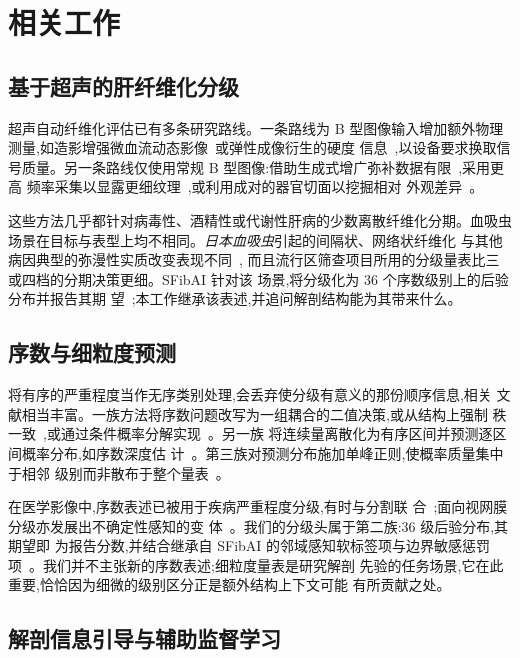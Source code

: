 \section{相关工作}
\label{sec:related}

\subsection{基于超声的肝纤维化分级}

超声自动纤维化评估已有多条研究路线。一条路线为 B 型图像输入增加额外物理
测量,如造影增强微血流动态影像~\cite{microflow2023}或弹性成像衍生的硬度
信息~\cite{swe2018staging},以设备要求换取信号质量。另一条路线仅使用常规
B 型图像:借助生成式增广弥补数据有限~\cite{usfibrosisgan2022},采用更高
频率采集以显露更细纹理~\cite{hfus2025},或利用成对的器官切面以挖掘相对
外观差异~\cite{liverspleen2025}。

这些方法几乎都针对病毒性、酒精性或代谢性肝病的少数离散纤维化分期。血吸虫
场景在目标与表型上均不相同。\emph{日本血吸虫}引起的间隔状、网络状纤维化
与其他病因典型的弥漫性实质改变表现不同~\cite{schistoelasto2018,schistopocus2024},
而且流行区筛查项目所用的分级量表比三或四档的分期决策更细。SFibAI 针对该
场景,将分级化为 36 个序数级别上的后验分布并报告其期
望~\cite{xu2026sfibai};本工作继承该表述,并追问解剖结构能为其带来什么。

\subsection{序数与细粒度预测}

将有序的严重程度当作无序类别处理,会丢弃使分级有意义的那份顺序信息,相关
文献相当丰富。一族方法将序数问题改写为一组耦合的二值决策,或从结构上强制
秩一致~\cite{coral2020},或通过条件概率分解实现~\cite{corn2023}。另一族
将连续量离散化为有序区间并预测逐区间概率分布,如序数深度估
计~\cite{dorn2018}。第三族对预测分布施加单峰正则,使概率质量集中于相邻
级别而非散布于整个量表~\cite{unimodalbeta2021}。

在医学影像中,序数表述已被用于疾病严重程度分级,有时与分割联
合~\cite{sonnet2022};面向视网膜分级亦发展出不确定性感知的变
体~\cite{drgraduate2020}。我们的分级头属于第二族:36 级后验分布,其期望即
为报告分数,并结合继承自 SFibAI 的邻域感知软标签项与边界敏感惩罚
项~\cite{xu2026sfibai}。我们并不主张新的序数表述;细粒度量表是研究解剖
先验的任务场景,它在此重要,恰恰因为细微的级别区分正是额外结构上下文可能
有所贡献之处。

\subsection{解剖信息引导与辅助监督学习}

